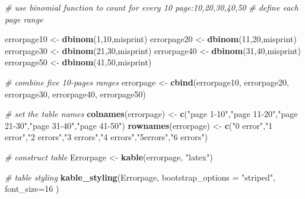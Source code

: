 \documentclass[]{article}
\newenvironment{Shaded}{\begin{snugshade}}{\end{snugshade}}
\newcommand{\KeywordTok}[1]{\textcolor[rgb]{0.13,0.29,0.53}{\textbf{#1}}}
\newcommand{\DataTypeTok}[1]{\textcolor[rgb]{0.13,0.29,0.53}{#1}}
\newcommand{\DecValTok}[1]{\textcolor[rgb]{0.00,0.00,0.81}{#1}}
\newcommand{\StringTok}[1]{\textcolor[rgb]{0.31,0.60,0.02}{#1}}
\newcommand{\CommentTok}[1]{\textcolor[rgb]{0.56,0.35,0.01}{\textit{#1}}}
\newcommand{\NormalTok}[1]{#1}
\begin{document}
\begin{Shaded}
\begin{Highlighting}[]
\CommentTok{# use binomial function to count for every 10 page:10,20,30,40,50}
\CommentTok{# define each page range}

\NormalTok{errorpage10 <-}\StringTok{ }\KeywordTok{dbinom}\NormalTok{(}\DecValTok{1}\NormalTok{,}\DecValTok{10}\NormalTok{,misprint)}
\NormalTok{errorpage20 <-}\StringTok{ }\KeywordTok{dbinom}\NormalTok{(}\DecValTok{11}\NormalTok{,}\DecValTok{20}\NormalTok{,misprint)}
\NormalTok{errorpage30 <-}\StringTok{ }\KeywordTok{dbinom}\NormalTok{(}\DecValTok{21}\NormalTok{,}\DecValTok{30}\NormalTok{,misprint)}
\NormalTok{errorpage40 <-}\StringTok{ }\KeywordTok{dbinom}\NormalTok{(}\DecValTok{31}\NormalTok{,}\DecValTok{40}\NormalTok{,misprint)}
\NormalTok{errorpage50 <-}\StringTok{ }\KeywordTok{dbinom}\NormalTok{(}\DecValTok{41}\NormalTok{,}\DecValTok{50}\NormalTok{,misprint)}

\CommentTok{# combine five 10-pages ranges}
\NormalTok{errorpage <-}\StringTok{ }\KeywordTok{cbind}\NormalTok{(errorpage10, errorpage20, errorpage30, errorpage40, errorpage50)}

\CommentTok{# set the table names}
\KeywordTok{colnames}\NormalTok{(errorpage) <-}\StringTok{ }\KeywordTok{c}\NormalTok{(}\StringTok{"page 1-10"}\NormalTok{,}\StringTok{"page 11-20"}\NormalTok{,}\StringTok{"page 21-30"}\NormalTok{,}\StringTok{"page 31-40"}\NormalTok{,}\StringTok{"page 41-50"}\NormalTok{)}
\KeywordTok{rownames}\NormalTok{(errorpage) <-}\StringTok{ }\KeywordTok{c}\NormalTok{(}\StringTok{"0 error"}\NormalTok{,}\StringTok{"1 error"}\NormalTok{,}\StringTok{"2 errors"}\NormalTok{,}\StringTok{"3 errors"}\NormalTok{,}\StringTok{"4 errors"}\NormalTok{,}\StringTok{"5errors"}\NormalTok{,}\StringTok{"6 errors"}\NormalTok{)}

\CommentTok{# construct table}
\NormalTok{Errorpage <-}\StringTok{ }\KeywordTok{kable}\NormalTok{(errorpage, }\StringTok{"latex"}\NormalTok{)}

\CommentTok{# table styling}
\KeywordTok{kable_styling}\NormalTok{(Errorpage, }\DataTypeTok{bootstrap_options =} \StringTok{"striped"}\NormalTok{, }\DataTypeTok{font_size=}\DecValTok{16}\NormalTok{ )}
\end{Highlighting}
\end{Shaded}
\end{document}
